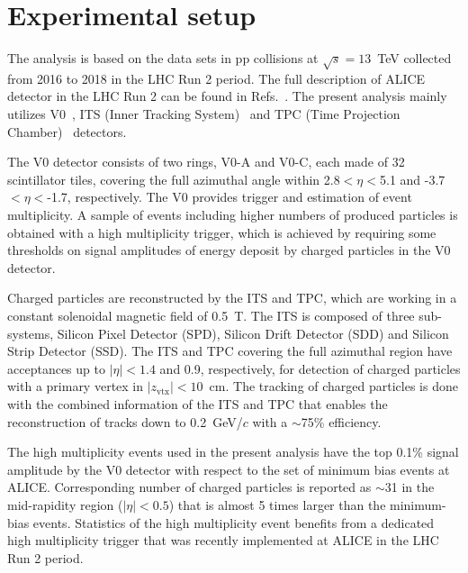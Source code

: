 
\section{Experimental setup}
\label{sec:experiment}

The analysis is based on the data sets in pp collisions at $\sqrt{s} = 13$~TeV collected from 2016 to 2018 in the LHC Run 2 period.  The full description of ALICE detector in the LHC Run 2 can be found in Refs.~\cite{Aamodt:2008zz,Abelev:2014ffa}. The present analysis mainly utilizes V0~\cite{Abbas:2013taa}, ITS (Inner Tracking System)~\cite{aliceITS} and TPC (Time Projection Chamber)~\cite{aliceTPC} detectors.


The V0 detector consists of two rings, V0-A and V0-C, each made of 32 scintillator tiles, covering the full azimuthal angle within 2.8$<\eta<$5.1 and -3.7$<\eta<$-1.7, respectively. The V0 provides trigger and estimation of event multiplicity. A sample of events including higher numbers of produced particles is obtained with a high multiplicity trigger, which is achieved by requiring some thresholds on signal amplitudes of energy deposit by charged particles in the V0 detector.

Charged particles are reconstructed by the ITS and TPC, which are working in a constant solenoidal magnetic field of 0.5~T.  The ITS is composed of three sub-systems, Silicon Pixel Detector (SPD), Silicon Drift Detector (SDD) and Silicon Strip Detector (SSD). The ITS and TPC covering the full azimuthal region have acceptances up to $|\eta| < 1.4$ and 0.9, respectively, for detection of charged particles with a primary vertex in $|z_\mathrm{vtx}|<10$~cm. The tracking of charged particles is done with the combined information of the ITS and TPC that enables the reconstruction of tracks down to 0.2~GeV/$c$ with a $\sim $75\% efficiency.


The high multiplicity events used in the present analysis have the top 0.1\% signal amplitude by the V0 detector with respect to the set of minimum bias events at ALICE. Corresponding number of charged particles is reported as $\sim$31 in the mid-rapidity region ($|\eta|<0.5$) that is almost 5 times larger than the minimum-bias events.  Statistics of the high multiplicity event benefits from a dedicated high multiplicity trigger that was recently implemented at ALICE  in the LHC Run 2 period.  
 


